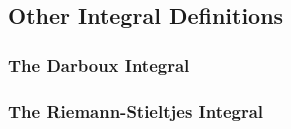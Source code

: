 







\subsection{Other Integral Definitions} 

\subsubsection{The Darboux Integral}







\subsubsection{The Riemann-Stieltjes Integral}



